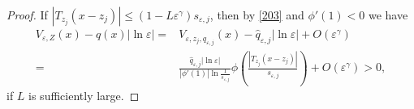 \documentclass[12pt,reqno]{amsart}
\numberwithin{equation}{section}
\theoremstyle{definition}
\theoremstyle{remark}
\begin{document}
\begin{proof}
If $ |T_{z_j}(x-z_j)|\leq \left( 1-L \varepsilon^\gamma \right) s_{\varepsilon,j}   $, then by \eqref{203} and $ \phi'(1)<0 $ we have
	\begin{equation*}
	\begin{split}
	V_{\varepsilon,Z}(x)-q(x)|\ln\varepsilon|=&V_{\varepsilon,z_j,\hat{q}_{\varepsilon,j}}(x)-\hat{q}_{\varepsilon,j}|\ln\varepsilon|+O\left(  \varepsilon^\gamma\right) \\
	= &\frac{\hat{q}_{\varepsilon,j}|\ln\varepsilon|}{|\phi'(1)|\ln\frac{1}{s_{\varepsilon,j}}}\phi\left( \frac{|T_{z_j}(x-z_j)|}{s_{\varepsilon,j}}\right) +O\left( \varepsilon^\gamma\right) >0,
	\end{split}
	\end{equation*}
	if $ L $ is sufficiently large.
	

\end{proof}
\end{document}
